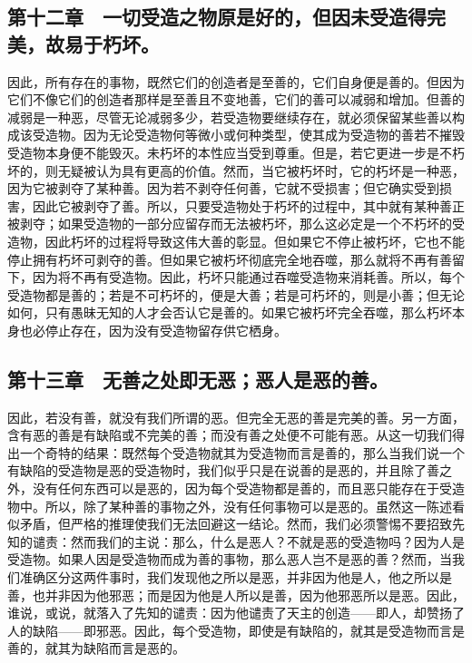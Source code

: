 
\subsection{第十二章　一切受造之物原是好的，但因未受造得完美，故易于朽坏。}

因此，所有存在的事物，既然它们的创造者是至善的，它们自身便是善的。但因为它们不像它们的创造者那样是至善且不变地善，它们的善可以减弱和增加。但善的减弱是一种恶，尽管无论减弱多少，若受造物要继续存在，就必须保留某些善以构成该受造物。因为无论受造物何等微小或何种类型，使其成为受造物的善若不摧毁受造物本身便不能毁灭。未朽坏的本性应当受到尊重。但是，若它更进一步是不朽坏的，则无疑被认为具有更高的价值。然而，当它被朽坏时，它的朽坏是一种恶，因为它被剥夺了某种善。因为若不剥夺任何善，它就不受损害；但它确实受到损害，因此它被剥夺了善。所以，只要受造物处于朽坏的过程中，其中就有某种善正被剥夺；如果受造物的一部分应留存而无法被朽坏，那么这必定是一个不朽坏的受造物，因此朽坏的过程将导致这伟大善的彰显。但如果它不停止被朽坏，它也不能停止拥有朽坏可剥夺的善。但如果它被朽坏彻底完全地吞噬，那么就将不再有善留下，因为将不再有受造物。因此，朽坏只能通过吞噬受造物来消耗善。所以，每个受造物都是善的；若是不可朽坏的，便是大善；若是可朽坏的，则是小善；但无论如何，只有愚昧无知的人才会否认它是善的。如果它被朽坏完全吞噬，那么朽坏本身也必停止存在，因为没有受造物留存供它栖身。\par


\subsection{第十三章　无善之处即无恶；恶人是恶的善。}

因此，若没有善，就没有我们所谓的恶。但完全无恶的善是完美的善。另一方面，含有恶的善是有缺陷或不完美的善；而没有善之处便不可能有恶。从这一切我们得出一个奇特的结果：既然每个受造物就其为受造物而言是善的，那么当我们说一个有缺陷的受造物是恶的受造物时，我们似乎只是在说善的是恶的，并且除了善之外，没有任何东西可以是恶的，因为每个受造物都是善的，而且恶只能存在于受造物中。所以，除了某种善的事物之外，没有任何事物可以是恶的。虽然这一陈述看似矛盾，但严格的推理使我们无法回避这一结论。然而，我们必须警惕不要招致先知的谴责：然而我们的主说：那么，什么是恶人？不就是恶的受造物吗？因为人是受造物。如果人因是受造物而成为善的事物，那么恶人岂不是恶的善？然而，当我们准确区分这两件事时，我们发现他之所以是恶，并非因为他是人，他之所以是善，也并非因为他邪恶；而是因为他是人所以是善，因为他邪恶所以是恶。因此，谁说，或说，就落入了先知的谴责：因为他谴责了天主的创造——即人，却赞扬了人的缺陷——即邪恶。因此，每个受造物，即使是有缺陷的，就其是受造物而言是善的，就其为缺陷而言是恶的。\par


